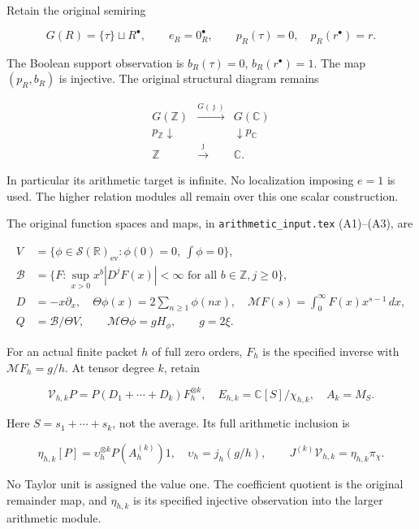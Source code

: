 \documentclass[
  11pt,
]{article}
\begin{document}
Retain the original semiring

\[
G(R)=\{\tau\}\sqcup R^\bullet,\qquad e_R=0_R^\bullet,
\qquad p_R(\tau)=0,\quad p_R(r^\bullet)=r.
\tag{2}
\]

The Boolean support observation is \(b_R(\tau)=0\),
\(b_R(r^\bullet)=1\). The map \((p_R,b_R)\) is injective. The original
structural diagram remains

\[
\begin{array}{ccc}
G(\mathbb Z)&\xrightarrow{G(\jmath)}&G(\mathbb C)\\
p_{\mathbb Z}\downarrow&&\downarrow p_{\mathbb C}\\
\mathbb Z&\xrightarrow{\jmath}&\mathbb C.
\end{array}
\tag{3}
\]

In particular its arithmetic target is infinite. No localization
imposing \(e=1\) is used. The higher relation modules all remain over
this one scalar construction.

The original function spaces and maps, in \texttt{arithmetic\_input.tex}
(A1)--(A3), are

\[
\begin{aligned}
V&=\{\phi\in\mathcal S(\mathbb R)_{\mathrm{ev}}:\phi(0)=0,\ \int\phi=0\},\\
\mathscr B&=\{F:\sup_{x>0}x^b|D^jF(x)|<\infty\text{ for all }b\in\mathbb Z,j\ge0\},\\
D&=-x\partial_x,\quad
\Theta\phi(x)=2\sum_{n\ge1}\phi(nx),\quad
\mathcal MF(s)=\int_0^\infty F(x)x^{s-1}\,dx,\\
Q&=\mathscr B/\Theta V,\qquad
\mathcal M\Theta\phi=gH_\phi,\qquad g=2\xi.
\end{aligned}
\tag{4}
\]

For an actual finite packet \(h\) of full zero orders, \(F_h\) is the
specified inverse with \(\mathcal MF_h=g/h\). At tensor degree \(k\),
retain

\[
\mathcal V_{h,k}P=P(D_1+\cdots+D_k)F_h^{\otimes k},\quad
E_{h,k}=\mathbb C[S]/\chi_{h,k},\quad A_k=M_S.
\tag{5}
\]

Here \(S=s_1+\cdots+s_k\), not the average. Its full arithmetic
inclusion is

\[
\eta_{h,k}[P]=\upsilon_h^{\otimes k}P(A_h^{(k)})1,
\quad \upsilon_h=j_h(g/h),\qquad
J^{(k)}\mathcal V_{h,k}=\eta_{h,k}\pi_\chi.
\tag{6}
\]

No Taylor unit is assigned the value one. The coefficient quotient is
the original remainder map, and \(\eta_{h,k}\) is its specified
injective observation into the larger arithmetic module.
\end{document}
